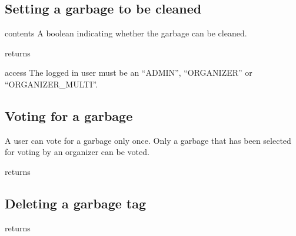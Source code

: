 \subsection{Setting a garbage to be cleaned}

\begin{apidata}{contents}
  A boolean indicating whether the garbage can be cleaned.
\end{apidata}
\begin{apidata}{returns}
  \begin{datalist}
  \end{datalist}
\end{apidata}
\begin{apidata}{access}
The logged in user must be an ``ADMIN'', ``ORGANIZER'' or ``ORGANIZER\_MULTI''.
\end{apidata}

\subsection{Voting for a garbage}

A user can vote for a garbage only once. Only a garbage that has been selected
for voting by an organizer can be voted.

\begin{apidata}{returns}
  \begin{datalist}
  \end{datalist}
\end{apidata}

\subsection{Deleting a garbage tag}

\begin{apidata}{returns}
  \begin{datalist}
  \end{datalist}
\end{apidata}



